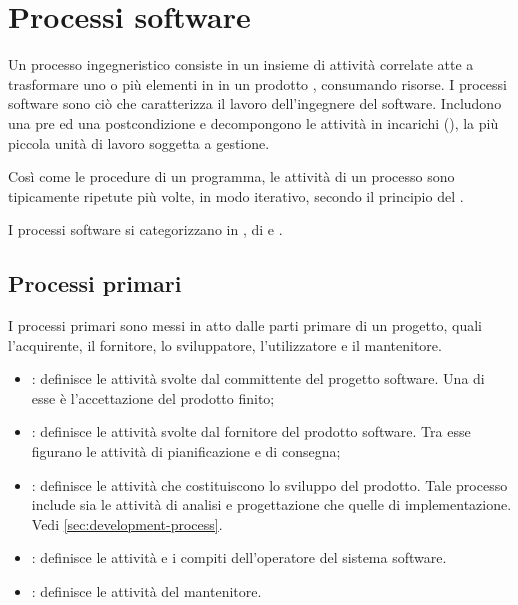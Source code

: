 \section{Processi software}

Un \gls{processo} ingegneristico consiste in un insieme di attività correlate
atte a trasformare uno o più elementi in  in un prodotto
, consumando risorse. I processi software sono ciò che
caratterizza il lavoro dell'ingegnere del software. Includono una pre ed una
postcondizione e decompongono le attività in incarichi (), la più
piccola unità di lavoro soggetta a gestione.

Così come le procedure di un programma, le attività di un processo sono
tipicamente ripetute più volte, in modo iterativo, secondo il principio del
.


I processi software si categorizzano in , di  e
.

\subsection{Processi primari}

I processi primari sono messi in atto dalle parti primare di un progetto, quali
l'acquirente, il fornitore, lo sviluppatore, l'utilizzatore e il mantenitore.

\begin{itemize}
  \item {}: definisce le attività svolte dal committente
    del progetto software. Una di esse è l'accettazione del prodotto finito;
  \item {}: definisce le attività svolte dal fornitore del
    prodotto software. Tra esse figurano le attività di pianificazione e di
    consegna;
  \item {}: definisce le attività che costituiscono lo sviluppo
    del prodotto. Tale processo include sia le attività di analisi e
    progettazione che quelle di implementazione. Vedi
    \ref{sec:development-process}.
  \item {}: definisce le attività e i
    compiti dell'operatore del sistema software.
  \item {}: definisce le attività del mantenitore.
\end{itemize}

